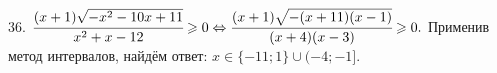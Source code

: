 36. $\cfrac{(x+1)\sqrt{-x^2-10x+11}}{x^2+x-12}\geqslant0\Leftrightarrow \cfrac{(x+1)\sqrt{-(x+11)(x-1)}}{(x+4)(x-3)}\geqslant0.$ Применив метод интервалов, найдём ответ: $x\in\{-11;1\}\cup(-4;-1].$
\begin{figure}[ht!]
\end{figure}\\
